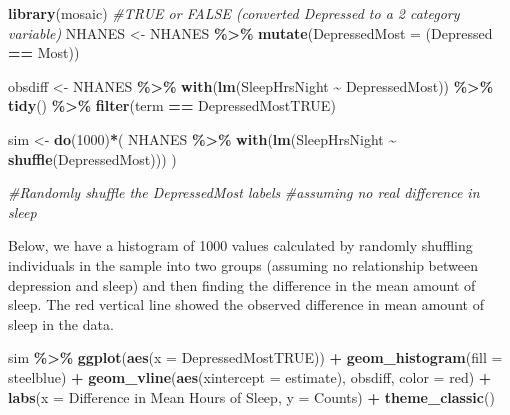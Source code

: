 \documentclass[
]{book}
\newenvironment{Shaded}{\begin{snugshade}}{\end{snugshade}}
\newcommand{\AttributeTok}[1]{\textcolor[rgb]{0.13,0.29,0.53}{#1}}
\newcommand{\CommentTok}[1]{\textcolor[rgb]{0.56,0.35,0.01}{\textit{#1}}}
\newcommand{\DecValTok}[1]{\textcolor[rgb]{0.00,0.00,0.81}{#1}}
\newcommand{\FunctionTok}[1]{\textcolor[rgb]{0.13,0.29,0.53}{\textbf{#1}}}
\newcommand{\NormalTok}[1]{#1}
\newcommand{\OtherTok}[1]{\textcolor[rgb]{0.56,0.35,0.01}{#1}}
\newcommand{\SpecialCharTok}[1]{\textcolor[rgb]{0.81,0.36,0.00}{\textbf{#1}}}
\newcommand{\StringTok}[1]{\textcolor[rgb]{0.31,0.60,0.02}{#1}}
\begin{document}
\begin{Shaded}
\begin{Highlighting}[]
\FunctionTok{library}\NormalTok{(mosaic) }
\CommentTok{\#TRUE or FALSE (converted Depressed to a 2 category variable)}
\NormalTok{NHANES }\OtherTok{\textless{}{-}}\NormalTok{ NHANES }\SpecialCharTok{\%\textgreater{}\%}
  \FunctionTok{mutate}\NormalTok{(}\AttributeTok{DepressedMost =}\NormalTok{ (Depressed }\SpecialCharTok{==} \StringTok{\textquotesingle{}Most\textquotesingle{}}\NormalTok{)) }

\NormalTok{obsdiff }\OtherTok{\textless{}{-}}\NormalTok{ NHANES }\SpecialCharTok{\%\textgreater{}\%} 
  \FunctionTok{with}\NormalTok{(}\FunctionTok{lm}\NormalTok{(SleepHrsNight }\SpecialCharTok{\textasciitilde{}}\NormalTok{ DepressedMost)) }\SpecialCharTok{\%\textgreater{}\%}
  \FunctionTok{tidy}\NormalTok{() }\SpecialCharTok{\%\textgreater{}\%}
  \FunctionTok{filter}\NormalTok{(term }\SpecialCharTok{==} \StringTok{\textquotesingle{}DepressedMostTRUE\textquotesingle{}}\NormalTok{)}

\NormalTok{sim }\OtherTok{\textless{}{-}} \FunctionTok{do}\NormalTok{(}\DecValTok{1000}\NormalTok{)}\SpecialCharTok{*}\NormalTok{(}
\NormalTok{  NHANES }\SpecialCharTok{\%\textgreater{}\%}
    \FunctionTok{with}\NormalTok{(}\FunctionTok{lm}\NormalTok{(SleepHrsNight }\SpecialCharTok{\textasciitilde{}} \FunctionTok{shuffle}\NormalTok{(DepressedMost)))}
\NormalTok{)}

\CommentTok{\#Randomly shuffle the DepressedMost labels }
\CommentTok{\#assuming no real difference in sleep}
\end{Highlighting}
\end{Shaded}

Below, we have a histogram of 1000 values calculated by randomly shuffling individuals in the sample into two groups (assuming no relationship between depression and sleep) and then finding the difference in the mean amount of sleep. The red vertical line showed the observed difference in mean amount of sleep in the data.

\begin{Shaded}
\begin{Highlighting}[]
\NormalTok{sim }\SpecialCharTok{\%\textgreater{}\%}
  \FunctionTok{ggplot}\NormalTok{(}\FunctionTok{aes}\NormalTok{(}\AttributeTok{x =}\NormalTok{ DepressedMostTRUE)) }\SpecialCharTok{+} 
  \FunctionTok{geom\_histogram}\NormalTok{(}\AttributeTok{fill =} \StringTok{\textquotesingle{}steelblue\textquotesingle{}}\NormalTok{) }\SpecialCharTok{+}
  \FunctionTok{geom\_vline}\NormalTok{(}\FunctionTok{aes}\NormalTok{(}\AttributeTok{xintercept =}\NormalTok{ estimate), obsdiff, }\AttributeTok{color =} \StringTok{\textquotesingle{}red\textquotesingle{}}\NormalTok{) }\SpecialCharTok{+} 
  \FunctionTok{labs}\NormalTok{(}\AttributeTok{x =} \StringTok{\textquotesingle{}Difference in Mean Hours of Sleep\textquotesingle{}}\NormalTok{, }\AttributeTok{y =} \StringTok{\textquotesingle{}Counts\textquotesingle{}}\NormalTok{) }\SpecialCharTok{+} 
  \FunctionTok{theme\_classic}\NormalTok{() }
\end{Highlighting}
\end{Shaded}
\end{document}
